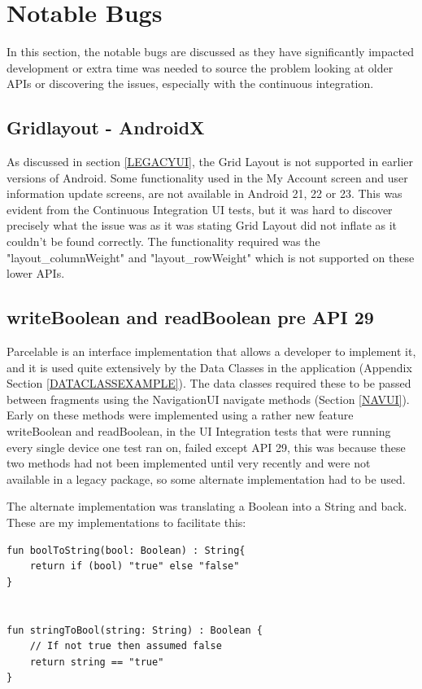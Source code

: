 \section{Notable Bugs}
In this section, the notable bugs are discussed as they have significantly impacted development or extra time was needed to source the problem looking at older APIs or discovering the issues, especially with the continuous integration.

    \subsection{Gridlayout - AndroidX}
    As discussed in section \ref{LEGACYUI}, the Grid Layout is not supported in earlier versions of Android. Some functionality used in the My Account screen and user information update screens, are not available in Android 21, 22 or 23. This was evident from the Continuous Integration UI tests, but it was hard to discover precisely what the issue was as it was stating Grid Layout did not inflate as it couldn't be found correctly. The functionality required was the "layout\_columnWeight" and "layout\_rowWeight" which is not supported on these lower APIs.
    
    \subsection{writeBoolean and readBoolean pre API 29}
    Parcelable is an interface implementation that allows a developer to implement it, and it is used quite extensively by the Data Classes in the application (Appendix Section \ref{DATACLASSEXAMPLE}). The data classes required these to be passed between fragments using the NavigationUI navigate methods (Section \ref{NAVUI}). Early on these methods were implemented using a rather new feature writeBoolean and readBoolean, in the UI Integration tests that were running every single device one test ran on, failed except API 29, this was because these two methods had not been implemented until very recently and were not available in a legacy package, so some alternate implementation had to be used.
    
    The alternate implementation was translating a Boolean into a String and back. These are my implementations to facilitate this:

\begin{verbatim}
fun boolToString(bool: Boolean) : String{
    return if (bool) "true" else "false"
}


fun stringToBool(string: String) : Boolean {
    // If not true then assumed false
    return string == "true"
}   
\end{verbatim}
    
